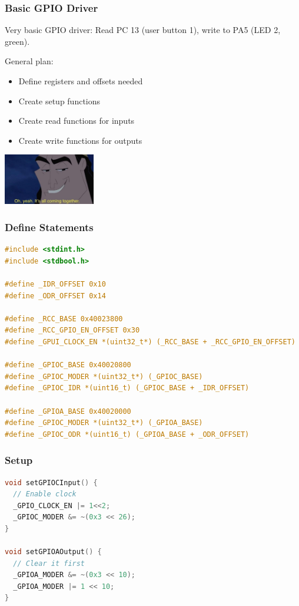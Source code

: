 \begin{frame}
\frametitle{Basic GPIO Driver}

Very basic GPIO driver: Read PC 13 (user button 1), write to PA5 (LED 2, green).

General plan:

\begin{itemize}
	\item Define registers and offsets needed
	\item Create setup functions
	\item Create read functions for inputs
	\item Create write functions for outputs
\end{itemize}

\begin{center}
	\includegraphics[width=0.3\textwidth]{images/comingtogether.jpg}
\end{center}

\end{frame}


\begin{frame}[fragile]
\frametitle{Define Statements}

\begin{lstlisting}[language=C]
#include <stdint.h>
#include <stdbool.h>

#define _IDR_OFFSET 0x10
#define _ODR_OFFSET 0x14

#define _RCC_BASE 0x40023800
#define _RCC_GPIO_EN_OFFSET 0x30
#define _GPUI_CLOCK_EN *(uint32_t*) (_RCC_BASE + _RCC_GPIO_EN_OFFSET)

#define _GPIOC_BASE 0x40020800
#define _GPIOC_MODER *(uint32_t*) (_GPIOC_BASE)
#define _GPIOC_IDR *(uint16_t) (_GPIOC_BASE + _IDR_OFFSET)

#define _GPIOA_BASE 0x40020000
#define _GPIOC_MODER *(uint32_t*) (_GPIOA_BASE)
#define _GPIOC_ODR *(uint16_t) (_GPIOA_BASE + _ODR_OFFSET)
\end{lstlisting}


\end{frame}


\begin{frame}[fragile]
\frametitle{Setup}

\begin{lstlisting}[language=C]
void setGPIOCInput() {
  // Enable clock
  _GPIO_CLOCK_EN |= 1<<2;
  _GPIOC_MODER &= ~(0x3 << 26);
}

void setGPIOAOutput() {
  // Clear it first
  _GPIOA_MODER &= ~(0x3 << 10);
  _GPIOA_MODER |= 1 << 10;
}
\end{lstlisting}

\end{frame}

